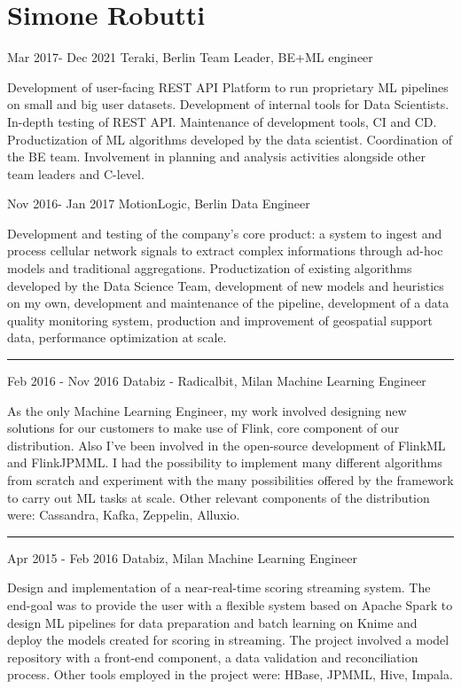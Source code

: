 \documentclass{tccv}
\begin{document}
\part{Simone Robutti}

\begin{eventlist}

\item{Mar 2017- Dec 2021}
     {Teraki, Berlin}
     {Team Leader, BE+ML engineer}

Development of user-facing REST API Platform to run proprietary ML pipelines on small and big user datasets. Development of internal tools for Data Scientists. In-depth testing of REST API. Maintenance of development tools, CI and CD. Productization of ML algorithms developed by the data scientist. Coordination of the BE team. Involvement in planning and analysis activities alongside other team leaders and C-level.


\item{Nov 2016- Jan 2017}
     {MotionLogic, Berlin}
     {Data Engineer}

Development and testing of the company's core product: a system to ingest and process cellular network signals to extract complex informations through ad-hoc models and traditional aggregations. Productization of existing algorithms developed by the Data Science Team, development of new models and heuristics on my own, development and maintenance of the pipeline, development of a data quality monitoring system, production and improvement of geospatial support data, performance optimization at scale.


\noindent\hfil\rule{0.3\textwidth}{.4pt}

\item{Feb 2016 - Nov 2016}
{Databiz - Radicalbit, Milan}
{Machine Learning Engineer}

As the only Machine Learning Engineer, my work involved designing new solutions for our customers to make use of Flink, core component of our distribution. Also I've been involved in the open-source development of FlinkML and FlinkJPMML. I had the possibility to implement many different algorithms from scratch and experiment with the many possibilities offered by the framework to carry out ML tasks at scale. Other relevant components of the distribution were: Cassandra, Kafka, Zeppelin, Alluxio.

\noindent\hfil\rule{0.3\textwidth}{.4pt}

\item{Apr 2015 - Feb 2016}
{Databiz, Milan}
{Machine Learning Engineer}

Design and implementation of a near-real-time scoring streaming system. The end-goal was to provide the user with a flexible system based on Apache Spark to design ML pipelines for data preparation and batch learning on Knime and deploy the models created for scoring in streaming. The project involved a model repository with a front-end component, a data validation and reconciliation process. Other tools employed in the project were: HBase, JPMML, Hive, Impala.

\end{eventlist}
\end{document}
